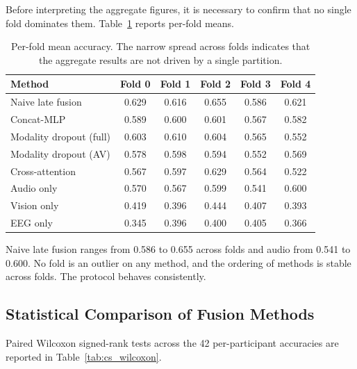 Before interpreting the aggregate figures, it is necessary to confirm that no single
fold dominates them. Table~\ref{tab:cs_perfold} reports per-fold means.

\begin{table}[htbp]
\centering
\caption{Per-fold mean accuracy. The narrow spread across folds indicates that the
aggregate results are not driven by a single partition.}
\label{tab:cs_perfold}
\begin{tabular}{lccccc}
\hline
\textbf{Method} & \textbf{Fold 0} & \textbf{Fold 1} & \textbf{Fold 2} & \textbf{Fold 3} & \textbf{Fold 4} \\
\hline
Naive late fusion       & 0.629 & 0.616 & 0.655 & 0.586 & 0.621 \\
Concat-MLP              & 0.589 & 0.600 & 0.601 & 0.567 & 0.582 \\
Modality dropout (full) & 0.603 & 0.610 & 0.604 & 0.565 & 0.552 \\
Modality dropout (AV)   & 0.578 & 0.598 & 0.594 & 0.552 & 0.569 \\
Cross-attention         & 0.567 & 0.597 & 0.629 & 0.564 & 0.522 \\
Audio only              & 0.570 & 0.567 & 0.599 & 0.541 & 0.600 \\
Vision only             & 0.419 & 0.396 & 0.444 & 0.407 & 0.393 \\
EEG only                & 0.345 & 0.396 & 0.400 & 0.405 & 0.366 \\
\hline
\end{tabular}
\end{table}

Naive late fusion ranges from 0.586 to 0.655 across folds and audio from 0.541 to
0.600. No fold is an outlier on any method, and the ordering of methods is stable
across folds. The protocol behaves consistently.

\subsection{Statistical Comparison of Fusion Methods}

Paired Wilcoxon signed-rank tests across the 42 per-participant accuracies are
reported in Table~\ref{tab:cs_wilcoxon}.

